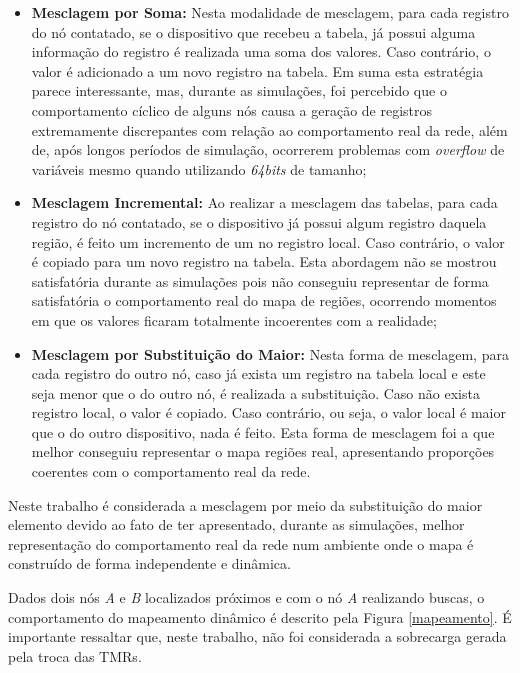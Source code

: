 \begin{itemize}
    \item \textbf{Mesclagem por Soma:} Nesta modalidade de mesclagem, para cada registro do nó contatado, se o dispositivo que recebeu a tabela, já possui alguma informação do registro é realizada uma soma dos valores. Caso contrário, o valor é adicionado a um novo registro na tabela. Em suma esta estratégia parece interessante, mas, durante as simulações, foi percebido que o comportamento cíclico de alguns nós causa a geração de registros extremamente discrepantes com relação ao comportamento real da rede, além de, após longos períodos de simulação, ocorrerem problemas com \emph{overflow} de variáveis mesmo quando utilizando \emph{64bits} de tamanho;
    \item \textbf{Mesclagem Incremental:} Ao realizar a mesclagem das tabelas, para cada registro do nó contatado, se o dispositivo já possui algum registro daquela região, é feito um incremento de um no registro local. Caso contrário, o valor é copiado para um novo registro na tabela. Esta abordagem não se mostrou satisfatória durante as simulações pois não conseguiu representar de forma satisfatória o comportamento real do mapa de regiões, ocorrendo momentos em que os valores ficaram totalmente incoerentes com a realidade;
    \item \textbf{Mesclagem por Substituição do Maior:} Nesta forma de mesclagem, para cada registro do outro nó, caso já exista um registro na tabela local e este seja menor que o do outro nó, é realizada a substituição. Caso não exista registro local, o valor é copiado. Caso contrário, ou seja, o valor local é maior que o do outro dispositivo, nada é feito. Esta forma de mesclagem foi a que melhor conseguiu representar o mapa regiões real, apresentando proporções coerentes com o comportamento real da rede.
\end{itemize}

Neste trabalho é considerada a mesclagem por meio da substituição do maior elemento devido ao fato de ter apresentado, durante as simulações, melhor representação do comportamento real da rede num ambiente onde o mapa é construído de forma independente e dinâmica.

Dados dois nós \emph{A} e \emph{B} localizados próximos e com o nó \emph{A} realizando buscas, o comportamento do mapeamento dinâmico é descrito pela Figura \ref{mapeamento}. É importante ressaltar que, neste trabalho, não foi considerada a sobrecarga gerada pela troca das TMRs.

